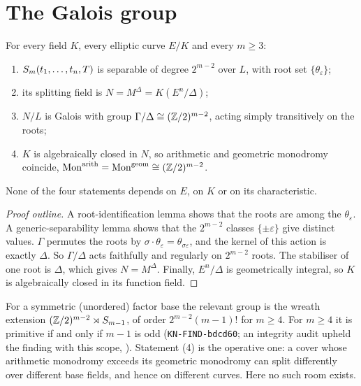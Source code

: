 \section{The Galois group}

\begin{theorem}\label{thm:cover}
For every field $K$, every elliptic curve $E/K$ and every $m\ge3$:
\begin{enumerate}
\item $S_{m}(t_1,\dots,t_n,T)$ is separable of degree $2^{m-2}$ over $L$,
  with root set $\{\theta_\varepsilon\}$;
\item its splitting field is $N=M^\Delta=K(E^n/\Delta)$;
\item $N/L$ is Galois with group $\Gamma/\Delta\cong(\mathbb{Z}/2)^{m-2}$, acting
  simply transitively on the roots;
\item $K$ is algebraically closed in $N$, so arithmetic and geometric
  monodromy coincide, $\mathrm{Mon}^{\mathrm{arith}}=\mathrm{Mon}^{\mathrm{geom}}\cong(\mathbb{Z}/2)^{m-2}$.
\end{enumerate}
None of the four statements depends on $E$, on $K$ or on its
characteristic.
\end{theorem}

\begin{proof}[Proof outline]
A root-identification lemma shows that the roots are among the
$\theta_\varepsilon$. A generic-separability lemma shows that the
$2^{m-2}$ classes $\{\pm\varepsilon\}$ give distinct values. $\Gamma$
permutes the roots by $\sigma\cdot\theta_\varepsilon=\theta_{\sigma\varepsilon}$,
and the kernel of this action is exactly $\Delta$. So $\Gamma/\Delta$ acts
faithfully and regularly on $2^{m-2}$ roots. The stabiliser of one root is
$\Delta$, which gives $N=M^\Delta$. Finally, $E^n/\Delta$ is geometrically
integral, so $K$ is algebraically closed in its function field.
\end{proof}

For a symmetric (unordered) factor base the relevant group is the wreath
extension $(\mathbb{Z}/2)^{m-2}\rtimes S_{m-1}$, of order $2^{m-2}(m-1)!$ for
$m\ge4$. For $m\ge4$ it is primitive if and only if $m-1$ is odd
(\texttt{KN-FIND-bdcd60}; an integrity audit upheld the finding with this
scope, ). Statement (4) is the operative one: a cover
whose arithmetic monodromy exceeds its geometric monodromy can split
differently over different base fields, and hence on different curves.
Here no such room exists.

